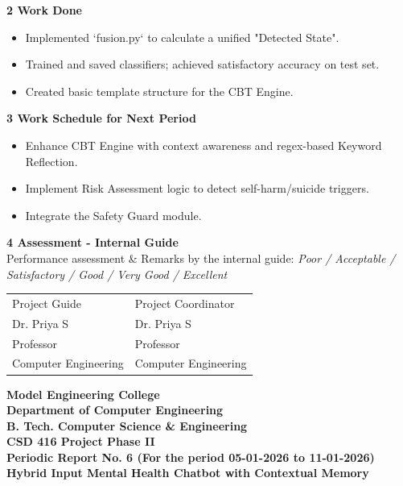 \documentclass[12pt,a4paper]{article}
\begin{document}
\noindent\textbf{2 \quad Work Done}
\begin{itemize}
    \item Implemented `fusion.py` to calculate a unified "Detected State".
    \item Trained and saved classifiers; achieved satisfactory accuracy on test set.
    \item Created basic template structure for the CBT Engine.
\end{itemize}

\noindent\textbf{3 \quad Work Schedule for Next Period}
\begin{itemize}
    \item Enhance CBT Engine with context awareness and regex-based Keyword Reflection.
    \item Implement Risk Assessment logic to detect self-harm/suicide triggers.
    \item Integrate the Safety Guard module.
\end{itemize}


\noindent\textbf{4 \quad Assessment - Internal Guide}\\[0.5em]
Performance assessment \& Remarks by the internal guide: \textit{Poor / Acceptable /}\\
\textit{Satisfactory / Good / Very Good / Excellent}\\[3em]

\noindent
\begin{tabular}{p{} p{}}
Project Guide & Project Coordinator\\[0.5em]
Dr. Priya S & Dr. Priya S\\
Professor & Professor\\
Computer Engineering & Computer Engineering\\
\end{tabular}

\vfill
\newpage


\begin{center}
{\Large \textbf{Model Engineering College}}\\[0.2em]
{\large \textbf{Department of Computer Engineering}}\\[0.2em]
{\large \textbf{B. Tech. Computer Science \& Engineering}}\\[0.2em]
{\large \textbf{CSD 416 Project Phase II}}\\[1em]
{\large \textbf{Periodic Report No. 6 (For the period 05-01-2026 to 11-01-2026)}}\\[1.5em]

{\Large \textbf{Hybrid Input Mental Health Chatbot with Contextual Memory}}\\[0.2em]

\end{center}
\end{document}
